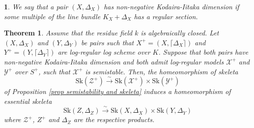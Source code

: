 \documentclass{amsart}%
\numberwithin{equation}{subsection}
\theoremstyle{plain2}
\newtheorem{theorem}[equation]{Theorem}
\theoremstyle{definition2}
\theoremstyle{stepstyle}
\theoremstyle{point}
\theoremstyle{subpoint}
\newtheorem{subpoint}[equation]{}%
\newcommand{\spa}[1]{\begin{subpoint}#1\end{subpoint}}           %
\newcommand{\cX}{\ensuremath{\mathscr{X}}}
\newcommand{\cY}{\ensuremath{\mathscr{Y}}}
\newcommand{\cZ}{\ensuremath{\mathscr{Z}}}
\renewcommand{\cZ}{\ensuremath{\mathscr{Z}}}
\renewcommand{\cY}{\ensuremath{\mathscr{Y}}}
\newcommand{\Sk}{\mathrm{Sk}}
\begin{document}
\spa{We say that a pair $(X,\Delta_X)$ has non-negative Kodaira-Iitaka dimension if some multiple of the line bundle $K_X + \Delta_X$ has a regular section.}
\begin{theorem} \label{thm essential skeleton of product via log-reg}
Assume that the residue field $k$ is algebraically closed. Let $(X,\Delta_X)$ and $(Y,\Delta_Y)$ be pairs such that $X^+=(X,\lceil \Delta_X \rceil)$ and $Y^+=(Y, \lceil \Delta_Y\rceil)$ are log-regular log scheme over $K$. Suppose that both pairs have non-negative Kodaira-Iitaka dimension and both admit log-regular models $\cX^+$ and $\cY^+$ over $S^+$, such that $\cX^+$ is semistable. Then, the homeomorphism of skeleta $$\Sk(\cZ^+) \xrightarrow{\sim} \Sk(\cX^+) \times \Sk(\cY^+)$$of Proposition \ref{prop semistability and skeleta} induces a homeomorphism of essential skeleta $$\Sk(Z,\Delta_Z) \xrightarrow{\sim} \Sk(X,\Delta_X) \times \Sk(Y,\Delta_Y)$$ where $\cZ^+$, $Z^+$ and $\Delta_Z$ are the respective products. 
\end{theorem}
\end{document}
